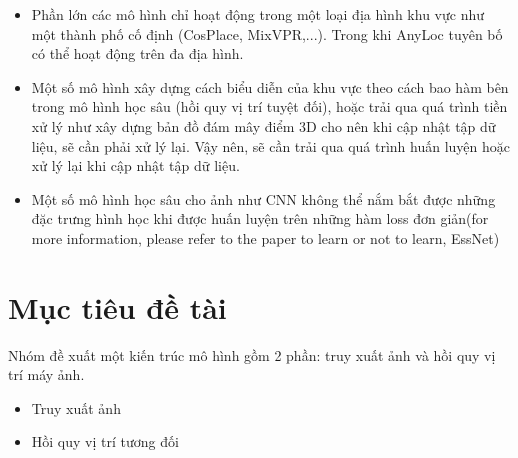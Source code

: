 \begin{itemize}
\begin{itemize}
        \item Phần lớn các mô hình chỉ hoạt động trong một loại địa hình khu vực như một thành phố cố định (CosPlace, MixVPR,...). Trong khi AnyLoc tuyên bố có thể hoạt động trên đa địa hình.
        \item Một số mô hình xây dựng cách biểu diễn của khu vực theo cách bao hàm bên trong mô hình học sâu (hồi quy vị trí tuyệt đối), hoặc trải qua quá trình tiền xử lý như xây dựng bản đồ đám mây điểm 3D cho nên khi cập nhật tập dữ liệu, sẽ cần phải xử lý lại. Vậy nên, sẽ cần trải qua quá trình huấn luyện hoặc xử lý lại khi cập nhật tập dữ liệu.
        \item Một số mô hình học sâu cho ảnh như CNN không thể nắm bắt được những đặc trưng hình học khi được huấn luyện trên những hàm loss đơn giản(for more information, please refer to the paper to learn or not to learn, EssNet)
    \end{itemize}
\end{itemize}

\section{Mục tiêu đề tài}

Nhóm đề xuất một kiến trúc mô hình gồm 2 phần: truy xuất ảnh và hồi quy vị trí máy ảnh. 
\begin{itemize}
    \item Truy xuất ảnh
    \item Hồi quy vị trí tương đối
\end{itemize}

